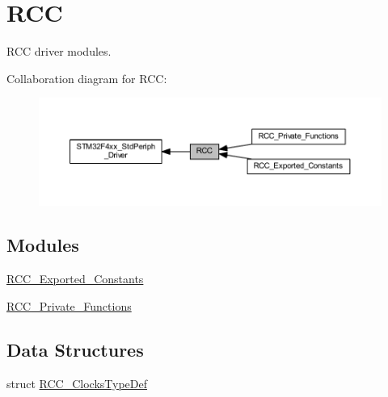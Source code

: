 \hypertarget{group___r_c_c}{}\section{R\+CC}
\label{group___r_c_c}


R\+CC driver modules.  


Collaboration diagram for R\+CC\+:\nopagebreak
\begin{figure}[H]
\begin{center}
\leavevmode
\includegraphics[width=350pt]{group___r_c_c}
\end{center}
\end{figure}
\subsection*{Modules}
\begin{DoxyCompactItemize}
\item 
\hyperlink{group___r_c_c___exported___constants}{R\+C\+C\+\_\+\+Exported\+\_\+\+Constants}
\item 
\hyperlink{group___r_c_c___private___functions}{R\+C\+C\+\_\+\+Private\+\_\+\+Functions}
\end{DoxyCompactItemize}
\subsection*{Data Structures}
\begin{DoxyCompactItemize}
\item 
struct \hyperlink{struct_r_c_c___clocks_type_def}{R\+C\+C\+\_\+\+Clocks\+Type\+Def}
\end{DoxyCompactItemize}

